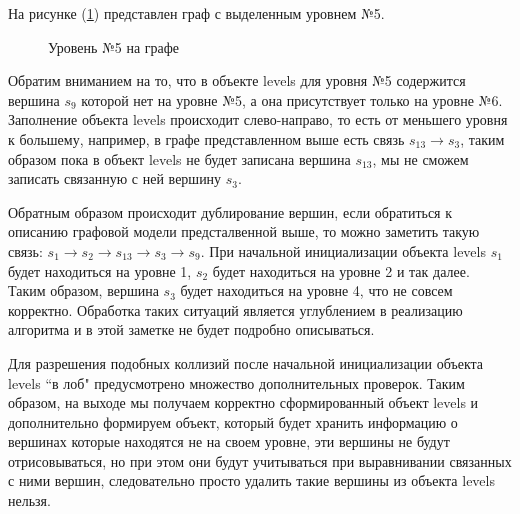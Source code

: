 На рисунке (\ref{fig:main_graph_level5}) представлен граф с выделенным уровнем №5.

\begin{figure}[ht!]
\caption{Уровень №5 на графе}
\label{fig:main_graph_level5}
\end{figure}

Обратим вниманием на то, что в объекте levels для уровня №5 содержится вершина $s_9$ которой нет на уровне №5, а она присутствует только на уровне №6. Заполнение объекта levels происходит слево-направо, то есть от меньшего
уровня к большему, например, в графе представленном выше есть связь $s_{13} \rightarrow s_3$, таким образом пока в объект levels не будет записана вершина $s_{13}$, мы не сможем записать связанную с ней вершину $s_3$.

Обратным образом происходит дублирование вершин, если обратиться к описанию графовой модели предсталвенной выше, то можно заметить такую связь: $s_1 \rightarrow s_2 \rightarrow s_{13} \rightarrow s_3 \rightarrow s_9$. При начальной инициализации объекта levels $s_1$ будет находиться на уровне 1, $s_2$ будет находиться на уровне 2 и так далее. Таким образом, вершина $s_3$ будет находиться на уровне 4, что не совсем корректно. Обработка таких ситуаций является углублением в реализацию алгоритма и в этой заметке не будет подробно описываться.

Для разрешения подобных коллизий после начальной инициализации объекта levels ``в лоб" предусмотрено множество дополнительных проверок. Таким образом, на выходе мы получаем корректно сформированный объект levels и дополнительно формируем объект, который будет хранить информацию о вершинах которые находятся не на своем уровне, эти вершины не будут отрисовываться, но при этом они будут учитываться при выравнивании связанных с ними вершин, следовательно просто удалить такие вершины из объекта levels нельзя.

